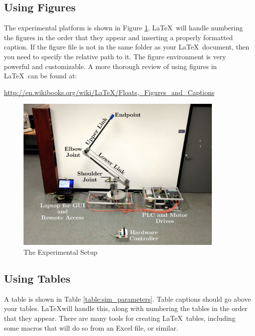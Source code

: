 \documentclass[11pt]{article}
\begin{document}
\subsection{Using Figures}
\label{sec:using_figures}
\vspace{-0.2in}
%
The experimental platform is shown in Figure \ref{fig:cherrypicker_labeled}. \LaTeX\ will handle numbering the figures in the order that they appear and inserting a properly formatted caption. 
If the figure file is not in the same folder as your \LaTeX\ document, then you need to specify the relative path to it. The figure environment is very powerful and customizable. A more thorough review of using figures in \LaTeX\ can be found at: 

\hspace{0.25in}\url{http://en.wikibooks.org/wiki/LaTeX/Floats,_Figures_and_Captions}
%

\begin{figure}[tbp]
\begin{center}
\includegraphics[width = 4in]{figures/Cherrypicker_labeled}
\caption{The Experimental Setup}
\label{fig:cherrypicker_labeled}
\end{center}
\vspace{-0.2in}
\end{figure}
%

\subsection{Using Tables}
\label{sec:tables}
\vspace{-0.2in}
%
A table is shown in Table \ref{table:sim_parameters}. Table captions should go above your tables. \LaTeX will handle this, along with numbering the tables in the order that they appear. There are many tools for creating \LaTeX\ tables, including some macros that will do so from an Excel file, or similar. 
\end{document}
